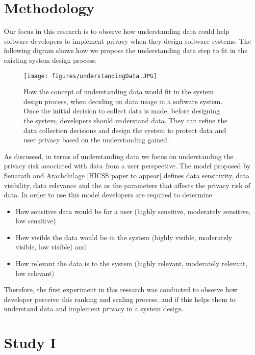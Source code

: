 \documentclass{sigchi}
\begin{document}
\section{Methodology}

Our focus in this research is to observe how understanding data could help software developers to implement privacy when they design software systems. The following digram shows how we propose the understanding data step to fit in the existing system design process.

\begin{figure}[h]
\begin{center}
\texttt{[image: figures/understandingData.JPG]}
\caption{How the concept of understanding data would fit in the system design process, when deciding on data usage in a software system. Once the initial decision to collect data is made, before designing the system, developers should understand data. They can refine the data collection decisions and design the system to protect data and user privacy based on the understanding gained. }
\end{center}
\end{figure}

As discussed, in terms of understanding data we focus on understanding the privacy risk associated with data from a user perspective. The model  proposed by Senarath and Arachchilage [HICSS paper to appear] defines data sensitivity, data visibility, data relevance and the as the parameters that affects the privacy risk of data. In order to use this model developers are required to determine 
\begin{itemize}
\item How sensitive data would be for a user (highly sensitive, moderately sensitive, low sensitive)
\item How visible the data would be in the system (highly visible, moderately visible, low visible) and
\item How relevant the data is to the system (highly relevant, moderately relevant, low relevant)
\end{itemize}

Therefore, the first experiment in this research was conducted to observe how developer perceive this ranking and scaling process, and if this helps them to understand data and implement privacy in a system design. 

\section {Study I }
\end{document}
